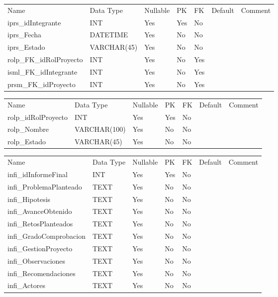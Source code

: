 			\begin{center}
				\begin{tabular}{ |l|l|l|l|l|l|l| }
					\hline
					Name & Data Type & Nullable & PK & FK & Default & Comment \\
					iprs_idIntegrante & INT & Yes & Yes & No &  & \\ \hline 
iprs_Fecha & DATETIME & Yes & No & No &  & \\ \hline 
iprs_Estado & VARCHAR(45) & Yes & No & No &  & \\ \hline 
rolp_FK_idRolProyecto & INT & Yes & No & Yes &  & \\ \hline 
isml_FK_idIntegrante & INT & Yes & No & Yes &  & \\ \hline 
prsm_FK_idProyecto & INT & Yes & No & Yes &  & \\ \hline 

				\end{tabular}
			\end{center}
		

			\begin{center}
				\begin{tabular}{ |l|l|l|l|l|l|l| }
					\hline
					Name & Data Type & Nullable & PK & FK & Default & Comment \\
					rolp_idRolProyecto & INT & Yes & Yes & No &  & \\ \hline 
rolp_Nombre & VARCHAR(100) & Yes & No & No &  & \\ \hline 
rolp_Estado & VARCHAR(45) & Yes & No & No &  & \\ \hline 

				\end{tabular}
			\end{center}
		

			\begin{center}
				\begin{tabular}{ |l|l|l|l|l|l|l| }
					\hline
					Name & Data Type & Nullable & PK & FK & Default & Comment \\
					infi_idInformeFinal & INT & Yes & Yes & No &  & \\ \hline 
infi_ProblemaPlanteado & TEXT & Yes & No & No &  & \\ \hline 
infi_Hipotesis & TEXT & Yes & No & No &  & \\ \hline 
infi_AvanceObtenido & TEXT & Yes & No & No &  & \\ \hline 
infi_RetosPlanteados & TEXT & Yes & No & No &  & \\ \hline 
infi_GradoComprobacion & TEXT & Yes & No & No &  & \\ \hline 
infi_GestionProyecto & TEXT & Yes & No & No &  & \\ \hline 
infi_Observaciones & TEXT & Yes & No & No &  & \\ \hline 
infi_Recomendaciones & TEXT & Yes & No & No &  & \\ \hline 
infi_Actores & TEXT & Yes & No & No &  & \\ \hline 

				\end{tabular}
			\end{center}
		

